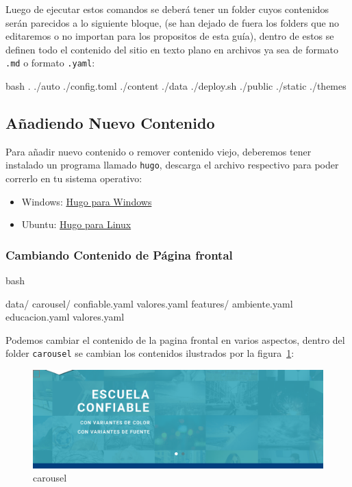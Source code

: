 Luego de ejecutar estos comandos se deberá tener un folder cuyos contenidos serán parecidos a lo siguiente bloque, (se han dejado de fuera los folders que no editaremos o no importan para los propositos de esta guía), dentro de estos se definen todo el contenido del sitio en texto plano en archivos ya sea de formato \texttt{.md} o formato \texttt{.yaml}:

\begin{codeblock}{bash}
.
./auto
./config.toml
./content
./data
./deploy.sh
./public
./static
./themes
\end{codeblock}

\subsection{Añadiendo Nuevo Contenido}

Para añadir nuevo contenido o remover contenido viejo, deberemos tener instalado un programa llamado \texttt{hugo}, descarga el archivo respectivo para poder correrlo en tu sistema operativo:

\begin{itemize}
\item Windows: \href{https://github.com/gohugoio/hugo/releases/download/v0.52/hugo_0.52_Windows-64bit.zip}{Hugo para Windows}
\item Ubuntu: \href{https://github.com/gohugoio/hugo/releases/download/v0.52/hugo_0.52_Linux-64bit.deb}{Hugo para Linux}
\end{itemize}

\subsubsection{Cambiando Contenido de Página
frontal}

\begin{codeblock}{bash}

data/
  carousel/
    confiable.yaml
    valores.yaml
  features/
    ambiente.yaml
    educacion.yaml
    valores.yaml
\end{codeblock}

Podemos cambiar el contenido de la pagina frontal en varios aspectos, dentro del folder \texttt{carousel} se cambian los contenidos ilustrados por la figura~\ref{fig:carousel}:

\begin{figure}[htbp]
\centering
\includegraphics[width=12cm]{../static/img/carousel.png}
\caption{carousel}
\label{fig:carousel}
\end{figure}

